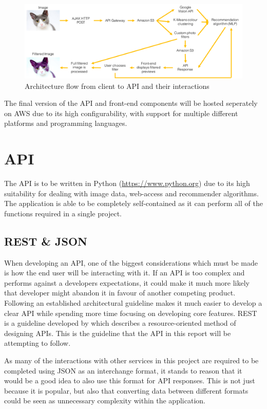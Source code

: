 \documentclass[a4paper,12pt]{report}
\begin{document}
    \begin{figure}[h]
      \centering
      \includegraphics[width=\linewidth]{application-diagram}
      \caption{Architecture flow from client to API and their interactions}
      \label{fig:application-diagram}
    \end{figure}

    The final version of the API and front-end components will be hosted seperately on AWS due to its high configurability, with support for multiple different platforms and programming languages.

  \section{API}
    The API is to be written in Python (\url{https://www.python.org}) due to its high suitability for dealing with image data, web-access and recommender algorithms. The application is able to be completely self-contained as it can perform all of the functions required in a single project.

    \subsection{REST \& JSON}
      When developing an API, one of the biggest considerations which must be made is how the end user will be interacting with it. If an API is too complex and performs against a developers expectations, it could make it much more likely that developer might abandon it in favour of another competing product. Following an established architectural guideline makes it much easier to develop a clear API while spending more time focusing on developing core features. REST is a guideline developed by \cite{fielding2000architectural} which describes a resource-oriented method of designing APIs. This is the guideline that the API in this report will be attempting to follow.

      As many of the interactions with other services in this project are required to be completed using JSON as an interchange format, it stands to reason that it would be a good idea to also use this format for API responses. This is not just because it is popular, but also that converting data between different formats could be seen as unnecessary complexity within the application.
\end{document}
